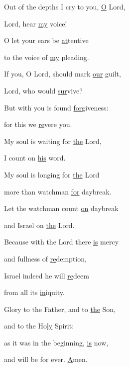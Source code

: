 \noindent Out of the depths I cry to you, \uline{O} Lord,~\GreStar{}~\nopagebreak

Lord, hear \uline{my} voice!

\noindent O let your ears be \uline{at}tentive~\GreStar{}~\nopagebreak

to the voice of \uline{my} pleading.

\noindent If you, O Lord, should mark \uline{our} guilt,~\GreStar{}~\nopagebreak

Lord, who would \uline{sur}vive?

\noindent But with you is found \uline{for}giveness:~\GreStar{}~\nopagebreak

for this we \uline{re}vere you.

\noindent My soul is waiting for \uline{the} Lord,~\GreStar{}~\nopagebreak

I count on \uline{his} word.

\noindent My soul is longing for \uline{the} Lord~\GreStar{}~\nopagebreak

more than watchman \uline{for} daybreak.

\noindent Let the watchman count \uline{on} daybreak~\GreStar{}~\nopagebreak

and Israel on \uline{the} Lord.

\noindent Because with the Lord there \uline{is} mercy~\GreStar{}~\nopagebreak

and fullness of \uline{re}demption,

\noindent Israel indeed he will \uline{re}deem~\GreStar{}~\nopagebreak

from all its \uline{in}iquity.

\noindent Glory to the Father, and to \uline{the} Son,~\GreStar{}~\nopagebreak

and to the Ho\uline{ly} Spirit:

\noindent as it was in the beginning, \uline{is} now,~\GreStar{}~\nopagebreak

and will be for ever. \uline{A}men.
